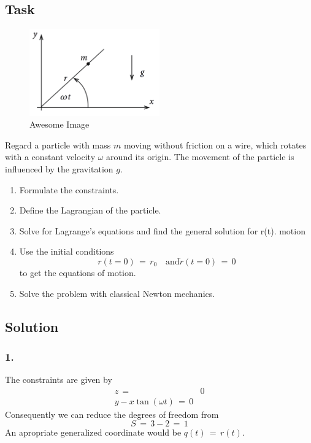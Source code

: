 \documentclass{report}
\begin{document}
\subsection{Task}
\begin{figure}[h]
    \centering
    \includegraphics[width=0.5\textwidth]{images/exercises_1_1.png}
    \caption{Awesome Image}
    \label{fig:awesome_image}
\end{figure}
Regard a particle with mass $m$ moving without friction on a wire, which rotates with a
constant velocity $\omega$ around its origin. The movement of the particle is
influenced by the gravitation $g$.
\begin{enumerate}
  \item Formulate the constraints.
  \item Define the Lagrangian of the particle.
  \item Solve for Lagrange's equations and find the general solution for r(t).
motion 
  \item Use the initial conditions
    \begin{equation*}
      r(t=0) \,=\, r_0 \quad \text{and} \dot r(t=0) \,=\, 0
    \end{equation*}
    to get the equations of motion.
  \item Solve the problem with classical Newton mechanics.
\end{enumerate}

\subsection{Solution}
\subsubsection{1.} 
The constraints are given by
\begin{align*}
  z \,=\,& 0 \\
  y - x \tan(\omega t) \,=\, 0
\end{align*}
Consequently we can reduce the degrees of freedom from 
\begin{equation*}
  S \,=\, 3 - 2 \,=\, 1
\end{equation*}
An apropriate generalized coordinate would be $q(t) \,=\, r(t)$.
\end{document}
